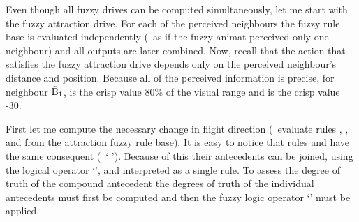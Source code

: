 Even though all fuzzy drives can be computed simultaneously, let me start with the fuzzy attraction drive. For each of the perceived neighbours the fuzzy rule base is evaluated independently (\ie\ as if the fuzzy animat perceived only one neighbour) and all outputs are later combined. Now, recall that the action that satisfies the fuzzy attraction drive depends only on the perceived neighbour's distance and position. Because all of the perceived information is precise, for neighbour ${\tilde{\mathrm{B}}}_1$,  is the crisp value 80\% of the visual range and  is the crisp value -30\deg. 

First let me compute the necessary change in flight direction (\ie\ evaluate rules , ,  and  from the attraction fuzzy rule base). It is easy to notice that rules  and  have the same consequent (\ie\ `  '). Because of this their antecedents can be joined, using the logical operator `', and interpreted as a single rule. To assess the degree of truth of the compound antecedent the degrees of truth of the individual antecedents must first be computed and then the fuzzy logic operator `' must be applied. 

